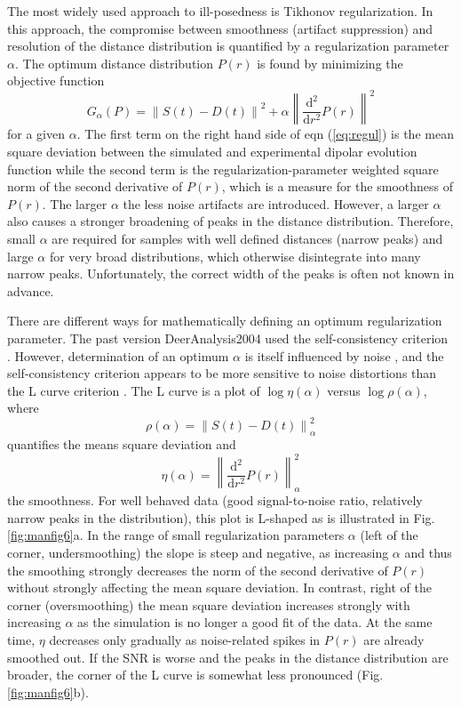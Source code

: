 \documentclass{article}
\begin{document}
The most widely used approach to ill-posedness is Tikhonov regularization. In this approach, the compromise between smoothness (artifact suppression) and resolution of the distance distribution is quantified by a regularization parameter $\alpha$. The optimum distance distribution $P(r)$ is found by minimizing the objective function
\begin{equation}
	G_{\alpha} \left( P \right) = \left\| S \left( t \right) - D \left( t \right)  \right\|^2 + \alpha \left\| \frac{\mathrm{d}^2}{\mathrm{d}r^2} P \left( r \right) \right\|^2
	\label{eq:regul}
\end{equation}
for a given $\alpha$. The first term on the right hand side of eqn (\ref{eq:regul}) is the mean square deviation between the simulated and experimental dipolar evolution function while the second term is the regularization-parameter weighted square norm of the second derivative of $P(r)$, which is a measure for the smoothness of $P(r)$. The larger $\alpha$ the less noise artifacts are introduced. However, a larger $\alpha$ also causes a stronger broadening of peaks in the distance distribution. Therefore, small $\alpha$ are required for samples with well defined distances (narrow peaks) and large $\alpha$ for very broad distributions, which otherwise disintegrate into many narrow peaks. Unfortunately, the correct width of the peaks is often not known in advance.  

There are different ways for mathematically defining an optimum regularization parameter. The past version DeerAnalysis2004 used the self-consistency criterion \cite{honerkamp1990, weese1992}. However, determination of an optimum $\alpha$ is itself influenced by noise \cite{jeschke2004a}, and the self-consistency criterion appears to be more sensitive to noise distortions than the L curve criterion \cite{freed2005}. The L curve is a plot of $\log \eta ( \alpha )$ versus $\log \rho ( \alpha )$, where 
\begin{equation}
	\rho \left( \alpha \right) = \left\| S \left( t \right) - D \left( t \right)  \right\|_{\alpha}^2
\end{equation}
quantifies the means square deviation and
\begin{equation}
	\eta \left( \alpha \right) = \left\| \frac{\mathrm{d}^2}{\mathrm{d}r^2} P \left( r \right) \right\|_{\alpha}^2
\end{equation}
the smoothness. For well behaved data (good signal-to-noise ratio, relatively narrow peaks in the distribution), this plot is L-shaped as is illustrated in Fig. \ref{fig:manfig6}a. In the range of small regularization parameters $\alpha$ (left of the corner, undersmoothing) the slope is steep and negative, as increasing $\alpha$ and thus the smoothing strongly decreases the norm of the second derivative of $P(r)$ without strongly affecting the mean square deviation. In contrast, right of the corner (oversmoothing) the mean square deviation increases strongly with increasing $\alpha$ as the simulation is no longer a good fit of the data. At the same time, $\eta$ decreases only gradually as noise-related spikes in $P(r)$ are already smoothed out. If the SNR is worse and the peaks in the distance distribution are broader, the corner of the L curve is somewhat less pronounced (Fig. \ref{fig:manfig6}b).
\end{document}
